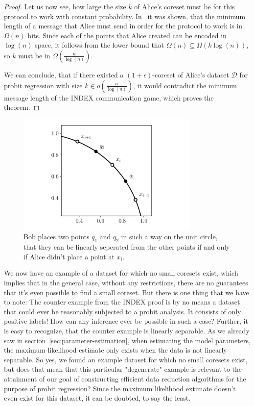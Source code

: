 \begin{proof}
    Let us now see, how large the size $k$ of Alice's coreset must be
    for this protocol to work with constant probability.
    In~\cite{index} it was shown, that the minimum length of a message
    that Alice must send in order for the protocol to work
    is in $\Omega(n)$ bits.
    Since each of the points that Alice created can be encoded in
    $\log(n)$ space, it follows from the lower bound that
    $\Omega(n) \subseteq \Omega(k \log(n))$, so $k$ must be in
    $\Omega\left(\frac{n}{\log(n)}\right)$.

    We can conclude, that if there existed a $(1 + \epsilon)$-coreset
    of Alice's dataset $\mathcal{D}$
    for probit regression with size $k \in o\left(\frac{n}{\log(n)}\right)$,
    it would contradict the minimum message length of
    the INDEX communication game, which proves the theorem.
\end{proof}

\begin{figure}[h]
    \centering
    \includegraphics[width=0.8\textwidth]{figures/index.pdf}
    \caption{Bob places two points $q_1$ and $q_2$ in such a way
        on the unit circle, that they can be linearly seperated from the other
        points if and only if Alice didn't place a point at $x_i$.}
    \label{fig:index}
\end{figure}

We now have an example of a dataset for which no small coresets exist,
which implies that in the general case, without any restrictions,
there are no guarantees that it's even possible to find a small coreset.
But there is one thing that we have to note:
The counter example from the INDEX proof is by no means a
dataset that could ever be reasonably subjected to a probit analysis.
It consists of only positive labels! How can any inference ever
be possible in such a case? Further, it is easy to recognize,
that the counter example is linearly separable.
As we already saw in section~\ref{sec:parameter-estimation}, when
estimating the model parameters, the maximum likelihood estimate
only exists when the data is not linearly separable.
So yes, we found an example dataset for which no small coresets exist, but
does that mean that this particular "degenerate" example is relevant
to the attainment of our goal of constructing efficient data reduction
algorithms for the purpose of probit regression? Since the
maximum likelihood extimate doesn't even exist for this dataset,
it can be doubted, to say the least.

